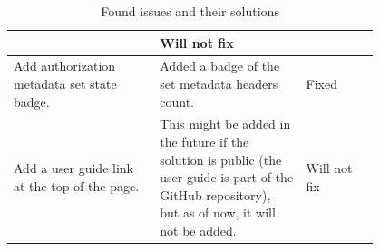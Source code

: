 \begin{table}[!htb]
{\begin{tabular}{|p{0.4\linewidth}|p{0.4\linewidth}|l|}
            & Will not fix \\
            \hline
            Add authorization metadata set state badge.
            & Added a badge of the set metadata headers count.
            & Fixed \\
            \hline
            Add a user guide link at the top of the page.
            & This might be added in the future if the solution is public (the user guide is part of the GitHub repository), but as of now, it will not be added.
            & Will not fix \\
            \hline
        \end{tabular}
    }
    \caption{Found issues and their solutions}
    \label{tab:user-testing-issues}
\end{table}


\newpage


